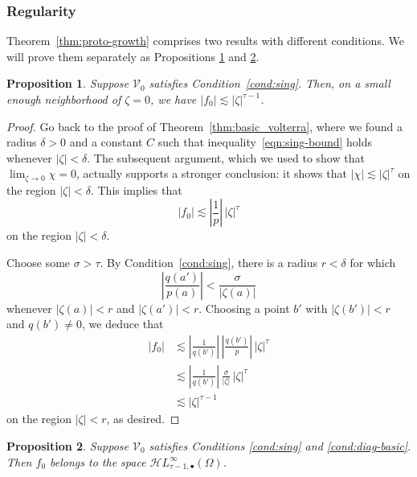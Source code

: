 \documentclass{article}
\theoremstyle{definition}
\theoremstyle{plain}
\newtheorem{proposition}{Proposition}
\newcommand{\singexp}[2]{\mathcal{H}L^\infty_{#1, #2}}
\newcommand{\singexpalg}[1]{\singexp{#1}{\bullet}}
\newcommand{\hardpart}{\mathcal{V}_0}
\newcommand{\solproto}{f_0}
\newcommand{\domain}{\Omega}
\begin{document}
\subsubsection{Regularity}\label{sec:asymptotics}
Theorem~\ref{thm:proto-growth} comprises two results with different conditions. We will prove them separately as Propositions \ref{prop:asymptotic at zero} and \ref{prop:asymptotic at infinity}.
\begin{proposition}\label{prop:asymptotic at zero}
Suppose $\hardpart$ satisfies {\em Condition~\eqref{cond:sing}}. Then, on a small enough neighborhood of $\zeta = 0$, we have $|\solproto| \lesssim |\zeta|^{\tau-1}$.
\end{proposition}

\begin{proof}
Go back to the proof of Theorem~\ref{thm:basic_volterra}, where we found a radius $\delta > 0$ and a constant $C$ such that inequality~\eqref{eqn:sing-bound} holds whenever $|\zeta| < \delta$. The subsequent argument, which we used to show that $\lim_{\zeta \to 0} \chi = 0$, actually supports a stronger conclusion: it shows that $|\chi| \lesssim |\zeta|^\tau$ on the region $|\zeta| < \delta$. This implies that
\[ |\solproto| \lesssim \left|\frac{1}{p}\right|\,|\zeta|^\tau \]
on the region $|\zeta| < \delta$.

Choose some $\sigma > \tau$. By Condition~\eqref{cond:sing}, there is a radius $r < \delta$ for which
\[ \left|\frac{q(a')}{p(a)}\right| < \frac{\sigma}{|\zeta(a)|} \]
whenever $|\zeta(a)| < r$ and $|\zeta(a')| < r$. Choosing a point $b'$ with $|\zeta(b')| < r$ and $q(b') \neq 0$, we deduce that
\begin{align*}
|\solproto| & \lesssim \left|\frac{1}{q(b')}\right|\,\left|\frac{q(b')}{p}\right|\,|\zeta|^\tau \\
& \lesssim \left|\frac{1}{q(b')}\right|\,\frac{\sigma}{|\zeta|}\,|\zeta|^\tau \\
& \lesssim |\zeta|^{\tau-1}
\end{align*}
on the region $|\zeta| < r$, as desired.
\end{proof}
\begin{proposition}\label{prop:asymptotic at infinity}
Suppose $\hardpart$ satisfies {\em Conditions \eqref{cond:sing}} and \eqref{cond:diag-basic}. Then $\solproto$ belongs to the space $\singexpalg{\tau-1}(\domain)$.
\end{proposition}
\end{document}
